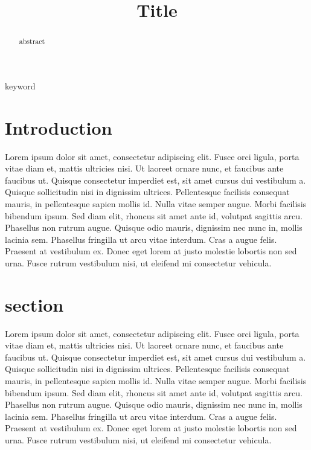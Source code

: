 \documentclass[conference]{IEEEtran}
\newcommand{\n}{\hfill\break}
\begin{document}
\makeatletter
\newlength{\logoheight}
\setlength{\logoheight}{50pt} %

    

\title{
    \textbf{Title}}

\author{
}

\maketitle

\begin{abstract}
abstract
\end{abstract}

\begin{IEEEkeywords}
keyword
\end{IEEEkeywords}
\n
\section{\textbf{Introduction}}

Lorem ipsum dolor sit amet, consectetur adipiscing elit. Fusce orci ligula, porta vitae diam et, mattis ultricies nisi. Ut laoreet ornare nunc, et faucibus ante faucibus ut. Quisque consectetur imperdiet est, sit amet cursus dui vestibulum a. Quisque sollicitudin nisi in dignissim ultrices. Pellentesque facilisis consequat mauris, in pellentesque sapien mollis id. Nulla vitae semper augue. Morbi facilisis bibendum ipsum. Sed diam elit, rhoncus sit amet ante id, volutpat sagittis arcu. Phasellus non rutrum augue. Quisque odio mauris, dignissim nec nunc in, mollis lacinia sem. Phasellus fringilla ut arcu vitae interdum. Cras a augue felis. Praesent at vestibulum ex. Donec eget lorem at justo molestie lobortis non sed urna. Fusce rutrum vestibulum nisi, ut eleifend mi consectetur vehicula.\n
\section{\textbf{section}}
Lorem ipsum dolor sit amet, consectetur adipiscing elit. Fusce orci ligula, porta vitae diam et, mattis ultricies nisi. Ut laoreet ornare nunc, et faucibus ante faucibus ut. Quisque consectetur imperdiet est, sit amet cursus dui vestibulum a. Quisque sollicitudin nisi in dignissim ultrices. Pellentesque facilisis consequat mauris, in pellentesque sapien mollis id. Nulla vitae semper augue. Morbi facilisis bibendum ipsum. Sed diam elit, rhoncus sit amet ante id, volutpat sagittis arcu. Phasellus non rutrum augue. Quisque odio mauris, dignissim nec nunc in, mollis lacinia sem. Phasellus fringilla ut arcu vitae interdum. Cras a augue felis. Praesent at vestibulum ex. Donec eget lorem at justo molestie lobortis non sed urna. Fusce rutrum vestibulum nisi, ut eleifend mi consectetur vehicula.\n
\end{document}

